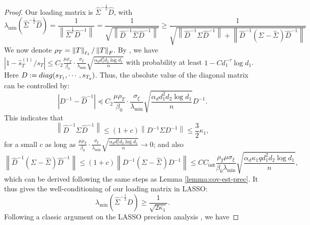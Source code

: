 \documentclass[12pt]{article}
\newcommand{\tF}{{\rm F}}
\newcommand{\abs}[1]{\left\lvert#1\right\rvert}
\newcommand{\norm}[1]{\left\lVert#1\right\rVert}
\newcommand{\init}{{\mathsf{init}}}
\theoremstyle{plain}
\begin{document}
\begin{proof}
Our loading matrix is $\widehat{\Sigma}^{-\frac{1}{2}}\widehat{D}$, with
\begin{equation*}
\lambda_{\min}(\widehat{\Sigma}^{-\frac{1}{2}}\widehat{D})   = \frac{1}{\norm{\widehat{\Sigma}^{\frac{1}{2}}\widehat{D}^{-1} } }=\frac{1}{\sqrt{\norm{\widehat{D}^{-1}\widehat{\Sigma}^{}\widehat{D}^{-1} } }}\ge \frac{1}{\sqrt{\norm{\widehat{D}^{-1}{\Sigma}^{}\widehat{D}^{-1} } + \norm{\widehat{D}^{-1}\left({\Sigma}^{} -\widehat{\Sigma}^{} \right) \widehat{D}^{-1} } }}
\end{equation*}
We now denote $\rho_T=\norm{T}_{\ell_1}/\norm{T}_{\tF}$. By \cite{xia2021statistical,ma2024statistical}, we have $\abs{1- \widehat{s}_T^{(1)}/s_T}\le  C_2  \frac{\mu\rho_T }{\beta_0} \cdot \frac{\sigma_{\xi}}{\lambda_{\min}} \sqrt{\frac{\alpha_d d_1^2 d_2 \log d_1}{n}} $ with probability at least $1-Cd_1^{-\tau}\log d_1 $. Here $D:={\rm diag}(s_{T_1},\cdots, s_{T_q})$. 
Thus, the absolute value of the diagonal matrix can be controlled by:
\begin{equation}
   \abs{ D^{-1}-\widehat{D}^{-1}}\preceq C_2  \frac{\mu\rho_T }{\beta_0} \cdot \frac{\sigma_{\xi}}{\lambda_{\min}} \sqrt{\frac{\alpha_d d_1^2 d_2 \log d_1}{n}} D^{-1}.
\end{equation}
This indicates that 
\begin{equation*}
   \norm{\widehat{D}^{-1}{\Sigma}^{}\widehat{D}^{-1} }\le (1+c)\norm{D^{-1}\Sigma D^{-1} }\le \frac{3}{2}\kappa_1,
\end{equation*}
for a small $c$ as long as $  \frac{\mu\rho_T }{\beta_0} \cdot \frac{\sigma_{\xi}}{\lambda_{\min}} \sqrt{\frac{\alpha_d d_1^2 d_2 \log d_1}{n}} \to 0$; and also
\begin{equation*}
    \norm{\widehat{D}^{-1}\left({\Sigma}^{} -\widehat{\Sigma}^{} \right) \widehat{D}^{-1} } \le (1+c)  \norm{{D}^{-1}\left({\Sigma}^{} -\widehat{\Sigma}^{} \right) {D}^{-1} }\le C C_{\init}\frac{\rho_T \mu \sigma_\xi }{\beta_0 \lambda_{\min} }\sqrt{\frac{\alpha_d \kappa_1 q d_1^2 d_2 \log d_1 }{n}},
\end{equation*}
which can be derived following the same steps as Lemma \ref{lemma:cov-est-prec}. It thus gives the well-conditioning of our loading matrix in LASSO:
\begin{equation*}
    \lambda_{\min} \left(\widehat{\Sigma}^{-\frac{1}{2}}\widehat{D}\right)\ge \frac{1}{\sqrt{2\kappa_1}}.
\end{equation*}
Following a classic argument on the LASSO precision analysis \citep{van2009conditions,buhlmann2011statistics}, we have


\end{proof}
\end{document}
